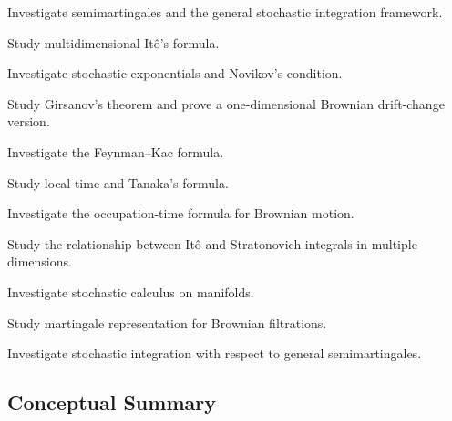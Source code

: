 \begin{exercise}[4]
Investigate semimartingales and the general stochastic integration
framework.
\end{exercise}

\begin{exercise}[4]
Study multidimensional It\^o's formula.
\end{exercise}

\begin{exercise}[4]
Investigate stochastic exponentials and Novikov's condition.
\end{exercise}

\begin{exercise}[4]
Study Girsanov's theorem and prove a one-dimensional Brownian drift-change
version.
\end{exercise}

\begin{exercise}[4]
Investigate the Feynman--Kac formula.
\end{exercise}

\begin{exercise}[4]
Study local time and Tanaka's formula.
\end{exercise}

\begin{exercise}[4]
Investigate the occupation-time formula for Brownian motion.
\end{exercise}

\begin{exercise}[4]
Study the relationship between It\^o and Stratonovich integrals in
multiple dimensions.
\end{exercise}

\begin{exercise}[4]
Investigate stochastic calculus on manifolds.
\end{exercise}

\begin{exercise}[4]
Study martingale representation for Brownian filtrations.
\end{exercise}

\begin{exercise}[4]
Investigate stochastic integration with respect to general
semimartingales.
\end{exercise}

\subsection{Conceptual Summary}
\label{subsec:stochastic-calculus-summary}

